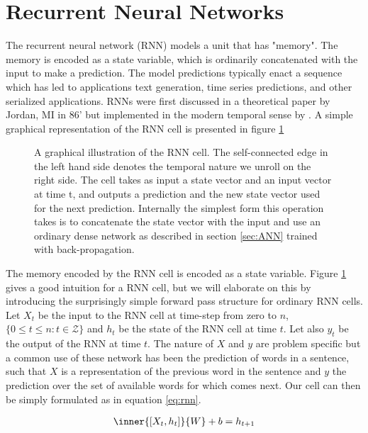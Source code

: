 
\section{Recurrent Neural Networks}\label{sec:rnn}


The recurrent neural network (RNN) models a unit that has "memory". The memory is encoded as a state variable, which is ordinarily concatenated with the input to make a prediction. The model predictions typically enact a sequence which has led to applications text generation, time series predictions, and other serialized applications. RNNs were first discussed in a theoretical paper by Jordan, MI in 86' but implemented in the modern temporal sense by \citet{Pearlmutter1989}. A simple graphical representation of the RNN cell is presented in figure \ref{fig:rnn}

\begin{figure}[h]
\centering
{} %

\caption[Recurrent neural network cell]{A graphical illustration of the RNN cell. The self-connected edge in the left hand side denotes the temporal nature we unroll on the right side. The cell takes as input a state vector and an input vector at time t, and outputs a prediction and the new state vector used for the next prediction. Internally the simplest form this operation takes is to concatenate the state vector with the input and use an ordinary dense network as described in section \ref{sec:ANN} trained with back-propagation.}\label{fig:rnn}
\end{figure}

The memory encoded by the RNN cell is encoded as a state variable. Figure \ref{fig:rnn} gives a good intuition for a RNN cell, but we will elaborate on this by introducing the surprisingly simple forward pass structure for ordinary RNN cells. Let $X_t$ be the input to the RNN cell at time-step from zero to $n$, $\{0 \leq t \leq n: t \in \mathcal{Z} \}$ and $h_t$ be the state of the RNN cell at time $t$. Let also $y_t$ be the output of the RNN at time $t$. The nature of $X$ and $y$ are problem specific but a common use of these network has been the prediction of words in a sentence, such that $X$ is a representation of the previous word in the sentence and $y$ the prediction over the set of available words for which comes next. Our cell can then be simply formulated as in equation \ref{eq:rnn}.

\begin{align}\label{eq:rnn}
\inner{[X_t, h_t]}{W} + b = h_{t+1}
\end{align}


